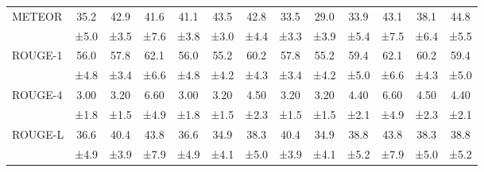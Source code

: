 \documentclass[main.tex]{subfiles}
\begin{document}
\begin{table}[t]
\begin{tabular}{l@{\hspace{5mm}}*{3}{c}@{\hspace{5mm}}*{3}{c}@{\hspace{5mm}}*{3}{c}@{\hspace{5mm}}*{3}{c}}
    \hline
    \multirow{2}{*}{METEOR} & {\normalsize 35.2} & {\normalsize 42.9} & {\normalsize 41.6} & {\normalsize 41.1} & {\normalsize 43.5} & {\normalsize 42.8} & {\normalsize 33.5} & {\normalsize 29.0} & {\normalsize 33.9} & {\normalsize 43.1} & {\normalsize 38.1} & {\normalsize 44.8} \\
                    & {\footnotesize ±5.0} & {\footnotesize ±3.5} & {\footnotesize ±7.6} & {\footnotesize ±3.8} & {\footnotesize ±3.0} & {\footnotesize ±4.4} & {\footnotesize ±3.3} & {\footnotesize ±3.9} & {\footnotesize ±5.4} & {\footnotesize ±7.5} & {\footnotesize ±6.4} & {\footnotesize ±5.5} \\
    \hline
    \multirow{2}{*}{ROUGE-1} & {\normalsize 56.0} & {\normalsize 57.8} & {\normalsize 62.1} & {\normalsize 56.0} & {\normalsize 55.2} & {\normalsize 60.2} & {\normalsize 57.8} & {\normalsize 55.2} & {\normalsize 59.4} & {\normalsize 62.1} & {\normalsize 60.2} & {\normalsize 59.4} \\
                     & {\footnotesize ±4.8} & {\footnotesize ±3.4} & {\footnotesize ±6.6} & {\footnotesize ±4.8} & {\footnotesize ±4.2} & {\footnotesize ±4.3} & {\footnotesize ±3.4} & {\footnotesize ±4.2} & {\footnotesize ±5.0} & {\footnotesize ±6.6} & {\footnotesize ±4.3} & {\footnotesize ±5.0} \\
    \hline
    \multirow{2}{*}{ROUGE-4} & {\normalsize 3.00} & {\normalsize 3.20} & {\normalsize 6.60} & {\normalsize 3.00} & {\normalsize 3.20} & {\normalsize 4.50} & {\normalsize 3.20} & {\normalsize 3.20} & {\normalsize 4.40} & {\normalsize 6.60} & {\normalsize 4.50} & {\normalsize 4.40} \\
                     & {\footnotesize ±1.8} & {\footnotesize ±1.5} & {\footnotesize ±4.9} & {\footnotesize ±1.8} & {\footnotesize ±1.5} & {\footnotesize ±2.3} & {\footnotesize ±1.5} & {\footnotesize ±1.5} & {\footnotesize ±2.1} & {\footnotesize ±4.9} & {\footnotesize ±2.3} & {\footnotesize ±2.1} \\
    \hline
    \multirow{2}{*}{ROUGE-L} & {\normalsize 36.6} & {\normalsize 40.4} & {\normalsize 43.8} & {\normalsize 36.6} & {\normalsize 34.9} & {\normalsize 38.3} & {\normalsize 40.4} & {\normalsize 34.9} & {\normalsize 38.8} & {\normalsize 43.8} & {\normalsize 38.3} & {\normalsize 38.8} \\
                     & {\footnotesize ±4.9} & {\footnotesize ±3.9} & {\footnotesize ±7.9} & {\footnotesize ±4.9} & {\footnotesize ±4.1} & {\footnotesize ±5.0} & {\footnotesize ±3.9} & {\footnotesize ±4.1} & {\footnotesize ±5.2} & {\footnotesize ±7.9} & {\footnotesize ±5.0} & {\footnotesize ±5.2} \\

\end{tabular}
\end{table}
\end{document}
